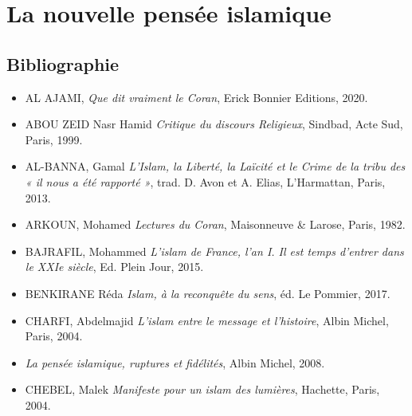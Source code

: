 \chapter{La nouvelle pensée islamique}


\section{Bibliographie}


\begin{itemize}
\item
  
  AL AJAMI, \emph{Que dit vraiment le Coran}, Erick Bonnier Editions,
  2020.
  
\item
  
  ABOU ZEID Nasr Hamid \emph{Critique du discours Religieux}, Sindbad,
  Acte Sud, Paris, 1999.
  
\item
  
  AL-BANNA, Gamal \emph{L'Islam, la Liberté, la Laïcité et le Crime de
  la tribu des « il nous a été rapporté »}, trad. D. Avon et A. Elias,
  L'Harmattan, Paris, 2013.
  
\item
  
  ARKOUN, Mohamed \emph{Lectures du Coran}, Maisonneuve \& Larose,
  Paris, 1982.
  
\item
  
  BAJRAFIL, Mohammed \emph{L'islam de France, l'an I. Il est temps
  d'entrer dans le XXIe siècle}, Ed. Plein Jour, 2015.
  
\item
  
  BENKIRANE Réda \emph{Islam, à la reconquête du sens}, éd. Le Pommier,
  2017.
  
\item
  
  CHARFI, Abdelmajid \emph{L'islam entre le message et l'histoire},
  Albin Michel, Paris, 2004.
  
\item


\emph{La pensée islamique, ruptures et fidélités}, Albin Michel, 2008.


 
\item
  
  CHEBEL, Malek \emph{Manifeste pour un islam des lumières}, Hachette,
  Paris, 2004.
  

\end{itemize}
